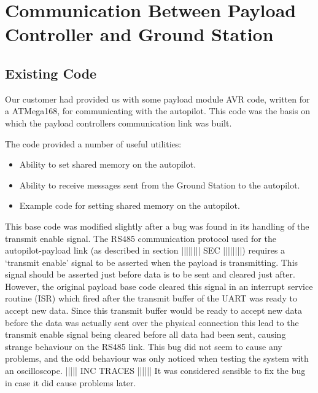 

\section{Communication Between Payload Controller and Ground Station}
\subsection{Existing Code}
Our customer had provided us with some payload module AVR code, written for a 
ATMega168, for communicating with the autopilot. This code was the basis on 
which the payload controllers communication link was built.

The code provided a number of useful utilities:
\begin{itemize}
\item Ability to set shared memory on the autopilot.

\item Ability to receive messages sent from the Ground Station to the 
autopilot.

\item Example code for setting shared memory on the autopilot.
\end{itemize}

This base code was modified slightly after a bug was found in its handling of 
the transmit enable signal. The RS485 communication protocol used for the 
autopilot-payload link (as described in section |||||||| SEC ||||||||) 
requires a `transmit enable' signal to be asserted when the payload is 
transmitting. This signal should be asserted just before data is to be sent 
and cleared just after. However, the original payload base code cleared this 
signal in an interrupt service routine (ISR) which fired after the transmit 
buffer of the UART was ready to accept new data. Since this transmit buffer 
would be ready to accept new data before the data was actually sent over the
physical connection this lead to the transmit enable signal being cleared
before all data had been sent, causing strange behaviour on the RS485 link.
This bug did not seem to cause any problems, and the odd behaviour was only
noticed when testing the system with an oscilloscope. ||||| INC TRACES ||||||
It was considered sensible to fix the bug in case it did cause problems later.

